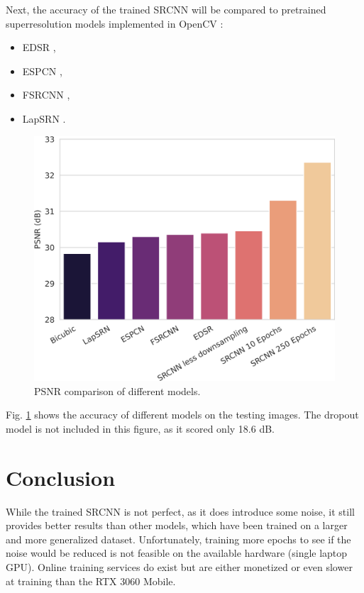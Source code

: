 \documentclass[english]{mvi-report}
\begin{document}
Next, the accuracy of the trained SRCNN will be compared to pretrained  superresolution models implemented in OpenCV \cite{OpenCV}:
\begin{itemize}
  \item EDSR \cite{Lim2017},
  \item ESPCN \cite{Shi2016},
  \item FSRCNN \cite{Dong2016},
  \item LapSRN \cite{Lai2017}.
\end{itemize}

\begin{figure}[htpb]
  \centering
  \includegraphics[width=\linewidth]{media/PSNR-comparison.png}
  \caption{PSNR comparison of different models.}
  \label{fig:psnr-comparison}
\end{figure}

Fig. \ref{fig:psnr-comparison} shows the accuracy of different models on the testing images. The dropout model is not included in this figure, as it scored only 18.6 dB.

\section{Conclusion}

While the trained SRCNN is not perfect, as it does introduce some noise, it still provides better results than other models, which have been trained on a larger and more generalized dataset. Unfortunately, training more epochs to see if the noise would be reduced is not feasible on the available hardware (single laptop GPU). Online training services do exist but are either monetized or even slower at training than the RTX 3060 Mobile.
\end{document}

